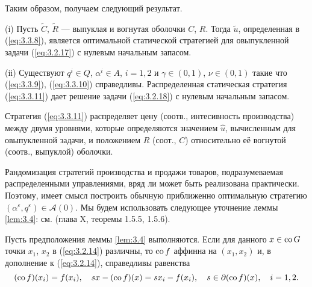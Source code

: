 Таким образом, получаем следующий результат.
\begin{theorem} \label{th:3.5}
(i) Пусть $\widetilde C$, $\widetilde R$ --- выпуклая и вогнутая оболочки $C$, $R$. Тогда $\widetilde u$, определенная в (\ref{eq:3.3.8}), является оптимальной статической стратегией для овыпукленной задачи (\ref{eq:3.2.17}) с нулевым начальным запасом.

(ii) Существуют $q^i\in Q$, $\alpha^i\in A$, $i=1,2$ и $\gamma\in (0,1)$, $\nu\in (0,1)$ такие что (\ref{eq:3.3.9}), (\ref{eq:3.3.10}) справедливы. Распределенная статическая стратегия (\ref{eq:3.3.11}) дает решение задачи (\ref{eq:3.2.18}) с нулевым начальным запасом.
\end{theorem}

Стратегия (\ref{eq:3.3.11}) распределяет цену (соотв., интесивность производства) между двумя уровнями, которые определяются значением $\widehat u$, вычисленным для овыпукленной задачи, и положением  $R$ (соот., $C$) относительно её вогнутой (соотв., выпуклой) оболочки.

Рандомизация стратегий производства и продажи товаров, подразумеваемая распределенными управлениями, вряд ли может быть реализована практически. Поэтому, имеет смысл построить обычную приближенно оптимальную стратегию $(\alpha^\varepsilon,q^\varepsilon)\in\mathscr A(0)$.
Мы будем использовать следующее уточнение леммы \ref{lem:3.4}: см. \cite{HirUrrLem93} (глава X, теоремы 1.5.5, 1.5.6).
\begin{lemma} \label{lem:3.5}
Пусть предположения леммы \ref{lem:3.4} выполняются. Если для данного $x\in{\rm co\,} G$ точки $x_1$, $x_2$ в (\ref{eq:3.2.14}) различны, то ${\rm co\,} f$ аффинна на $(x_1,x_2)$ и, в дополнение к (\ref{eq:3.2.14}), справедливы равенства
$$ ({\rm co\,} f)(x_i)=f(x_i),\quad s x-({\rm co\,} f)(x)=s x_i-f(x_i),\quad s\in\partial({\rm co\,} f)(x),\quad i=1,2.$$
\end{lemma}

